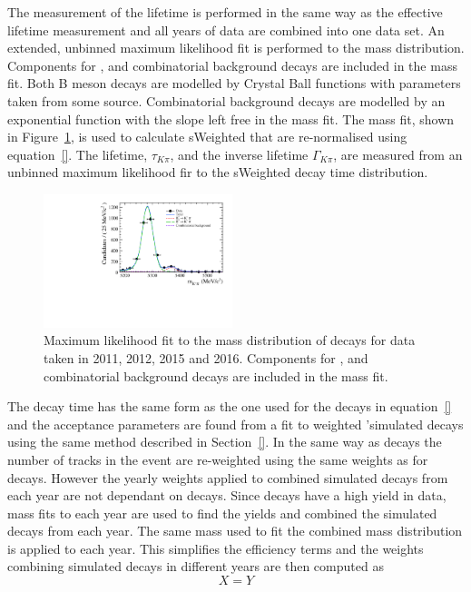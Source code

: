 The measurement of the \bdki lifetime is performed in the same way as the \bsmumu effective lifetime measurement and all years of data are combined into one data set. An extended, unbinned maximum likelihood fit is performed to the \bdkpi mass distribution. Components for \bdkpi, \bskpi and combinatorial background decays are included in the mass fit. Both B meson decays are modelled by Crystal Ball functions with parameters taken from some source. Combinatorial background decays are modelled by an exponential function with the slope left free in the mass fit. The mass fit, shown in Figure~\ref{fig:bdkpimassfit}, is used to calculate sWeighted that are re-normalised using equation~\ref{}. The lifetime, $\tau_{K\pi}$, and the inverse lifetime $\Gamma_{K\pi}$, are measured from an unbinned maximum likelihood fir to the sWeighted decay time distribution. 

\begin{figure}[htbp]
\centering
  \includegraphics[width=0.49\textwidth]{./Figs/LifetimeSystematics/Bd2KPi_mass_fit.pdf}
\caption{Maximum likelihood fit to the mass distribution of \bdkpi decays for data taken in 2011, 2012, 2015 and 2016. Components for \bdkpi, \bskpi and combinatorial background decays are included in the mass fit. }
\label{fig:bdkpimassfit}
\end{figure}


The decay time \pdf has the same form as the one used for the \bsmumu decays in equation~\ref{} and the acceptance parameters are found from a fit to weighted '\bdkpi simulated decays using the same method described in Section~\ref{}. In the same way as \bsmumu decays the number of tracks in the event are re-weighted using the same weights as for \bsmumu decays. However the yearly weights applied to combined simulated \bdkpi decays from each year are not dependant on \bsjpsiphi decays. Since \bdkpi decays have a high yield in data, mass fits to each year are used to find the yields and combined the simulated decays from each year. The same mass \pdf used to fit the combined mass distribution is applied to each year. This simplifies the efficiency terms and the weights combining simulated decays in different years are then computed as
\begin{equation}
X = Y
\end{equation}

